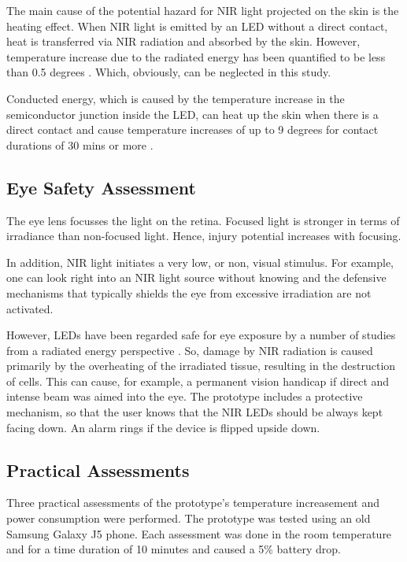 The main cause of the potential hazard for NIR light projected on the skin is the heating effect. When NIR light is emitted by an LED without a direct contact, heat is transferred via NIR radiation and absorbed by the skin. However, temperature increase due to the radiated energy has been quantified to be less than 0.5 degrees \parencite{ledSafety}. Which, obviously, can be neglected in this study.

Conducted energy, which is caused by the temperature increase in the semiconductor junction inside the LED, can heat up the skin when there is a direct contact and cause temperature increases of up to 9 degrees for contact durations of 30 mins or more \parencite{ledSafety}.

\subsection {Eye Safety Assessment}
The eye lens focusses the light on the retina. Focused light is stronger in terms of irradiance than non-focused light. Hence, injury potential increases with focusing.

In addition, NIR light initiates a very low, or non, visual stimulus. For example, one can look right into an NIR light source without knowing and the defensive mechanisms that typically shields the eye from excessive irradiation are not activated.

However, LEDs have been regarded safe for eye exposure by a number of studies from a radiated energy perspective \parencite{ledEyeSafe1} \parencite{ledEyeSafe2}.
So, damage by NIR radiation is caused primarily by the overheating of the irradiated tissue, resulting in the destruction of cells. This can cause, for example, a permanent vision handicap \parencite{ledEyeSafe3} if direct and intense beam was aimed into the eye.
The prototype includes a protective mechanism, so that the user knows that the NIR LEDs should be always kept facing down. An alarm rings if the device is flipped upside down.


\subsection{Practical Assessments}
Three practical assessments of the prototype’s temperature increasement and power consumption were performed. The prototype was tested using an old Samsung Galaxy J5 phone. Each assessment was done in the room temperature and for a time duration of 10 minutes and caused a 5\% battery drop.


